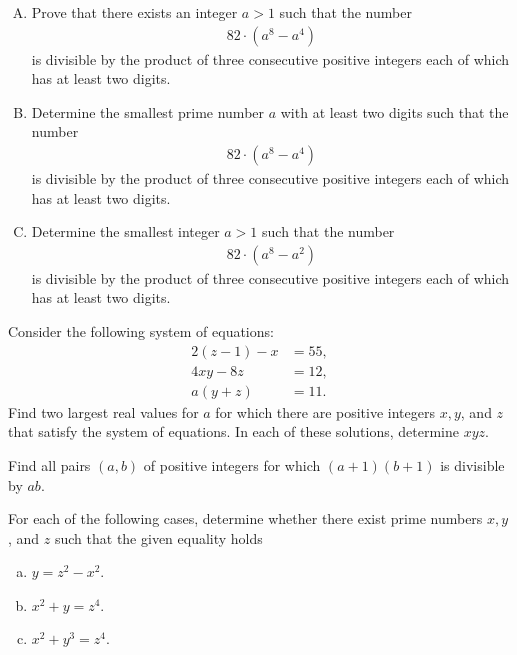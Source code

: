 \documentclass[problems.tex]{subfile}
\begin{document}
	
	\begin{problem} $ $
		\begin{enumerate}[(A)]
			\item Prove that there exists an integer $a>1$ such that the number
			\begin{align*}
				82 \cdot \left(a^8 - a^4\right)
			\end{align*}
			is divisible by the product of three consecutive positive integers each of which has at least two digits.
			\item Determine the smallest prime number $a$ with at least two digits such that the number
			\begin{align*}
				82 \cdot \left(a^8 - a^4\right)
			\end{align*}
			is divisible by the product of three consecutive positive integers each of which has at least two digits.
			\item Determine the smallest integer $a>1$ such that the number
			\begin{align*}
				82 \cdot \left(a^8 - a^2\right)
			\end{align*}
			is divisible by the product of three consecutive positive integers each of which has at least two digits.
		\end{enumerate}
	\end{problem}
	
	
	
	
	\begin{problem}
		Consider the following system of equations:
		\begin{align*}
			2(z-1) - x &= 55,\\
			4xy - 8z   &= 12,\\
			a(y+z)     &= 11.
		\end{align*}
		Find two largest real values for $a$ for which there are positive integers $x, y$, and $z$ that satisfy the system of equations. In each of these solutions, determine $xyz$.
	\end{problem}
	
	
	
	\begin{problem}
		Find all pairs $(a, b)$ of positive integers for which $(a + 1) (b + 1)$ is divisible by $ab$.
	\end{problem}
	
	
	\begin{problem}
		For each of the following cases, determine whether there exist prime numbers $x,y$, and $z$ such that the given equality holds
		\begin{enumerate}[(a)]
			\item $y=z^2-x^2$.
			\item $x^2+y=z^4$.
			\item $x^2 +y^3 = z^4$.
		\end{enumerate}
	\end{problem}
	
\end{document}
